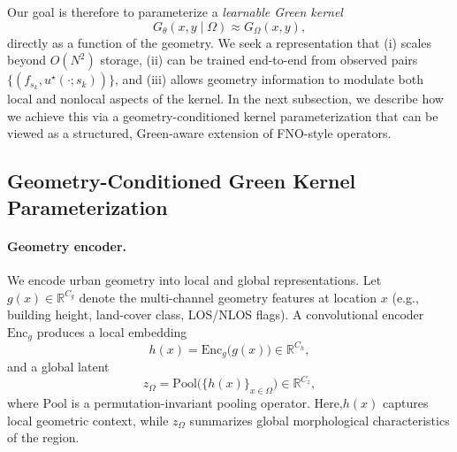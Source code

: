 \documentclass{article}
\begin{document}
Our goal is therefore to parameterize a \emph{learnable Green kernel}
\begin{equation}
G_\theta(x, y \mid \Omega)
\approx G_\Omega(x, y),
\end{equation}
directly as a function of the geometry.
We seek a representation that (i) scales beyond $O(N^2)$ storage,
(ii) can be trained end-to-end from observed pairs
$\{(f_{s_k}, u^\star(\cdot; s_k))\}$,
and (iii) allows geometry information to modulate both local and nonlocal
aspects of the kernel.
In the next subsection, we describe how we achieve this via a
geometry-conditioned kernel parameterization that can be viewed as a structured,
Green-aware extension of FNO-style operators.


\subsection{Geometry-Conditioned Green Kernel Parameterization}
\label{sec:kernel_param}

\vspace{0.3em}
\paragraph{Geometry encoder.}
We encode urban geometry into local and global representations.
Let $g(x) \in \mathbb{R}^{C_g}$ denote the multi-channel geometry features
at location $x$ (e.g., building height, land-cover class, LOS/NLOS flags).
A convolutional encoder $\mathrm{Enc}_g$ produces a local embedding
\begin{equation}
h(x) = \mathrm{Enc}_g\big(g(x)\big) \in \mathbb{R}^{C_h},
\end{equation}
and a global latent
\begin{equation}
z_\Omega = \mathrm{Pool}\big(\{h(x)\}_{x \in \Omega}\big) \in \mathbb{R}^{C_z},
\end{equation}
where $\mathrm{Pool}$ is a permutation-invariant pooling operator.
Here,$h(x)$ captures local geometric context, while $z_\Omega$
summarizes global morphological characteristics of the region.

\vspace{0.3em}
\end{document}
